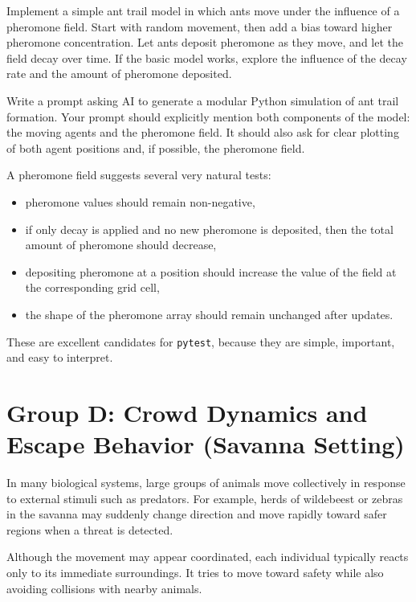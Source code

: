 \documentclass[paper=letter, fontsize=12pt]{article}
\numberwithin{equation}{section}
\begin{document}
\begin{taskbox}
Implement a simple ant trail model in which ants move under the influence of a pheromone field. Start with random movement, then add a bias toward higher pheromone concentration. Let ants deposit pheromone as they move, and let the field decay over time. If the basic model works, explore the influence of the decay rate and the amount of pheromone deposited.
\end{taskbox}

\begin{aibox}
Write a prompt asking AI to generate a modular Python simulation of ant trail formation. Your prompt should explicitly mention both components of the model: the moving agents and the pheromone field. It should also ask for clear plotting of both agent positions and, if possible, the pheromone field.
\end{aibox}

\begin{testbox}
A pheromone field suggests several very natural tests:
\begin{itemize}
\item pheromone values should remain non-negative,
\item if only decay is applied and no new pheromone is deposited, then the total amount of pheromone should decrease,
\item depositing pheromone at a position should increase the value of the field at the corresponding grid cell,
\item the shape of the pheromone array should remain unchanged after updates.
\end{itemize}
These are excellent candidates for \texttt{pytest}, because they are simple, important, and easy to interpret.
\end{testbox}

\section*{Group D: Crowd Dynamics and Escape Behavior (Savanna Setting)}

In many biological systems, large groups of animals move collectively in response to external stimuli such as predators. For example, herds of wildebeest or zebras in the savanna may suddenly change direction and move rapidly toward safer regions when a threat is detected.

Although the movement may appear coordinated, each individual typically reacts only to its immediate surroundings. It tries to move toward safety while also avoiding collisions with nearby animals.
\end{document}
